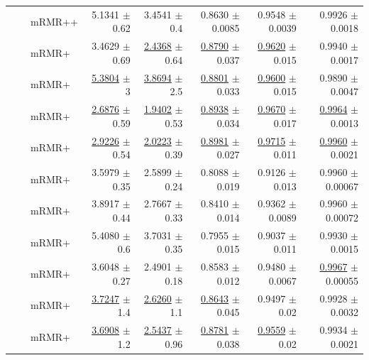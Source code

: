 \begin{longtable}{llp{}rrrrr}
 &  & mRMR++ & 5.1341 {\scriptsize $\pm$ 0.62} & 3.4541 {\scriptsize $\pm$ 0.4} & 0.8630 {\scriptsize $\pm$ 0.0085} & 0.9548 {\scriptsize $\pm$ 0.0039} & 0.9926 {\scriptsize $\pm$ 0.0018} \\
 &  & mRMR+ & 3.4629 {\scriptsize $\pm$ 0.69} & \underline{2.4368} {\scriptsize $\pm$ 0.64} & \underline{0.8790} {\scriptsize $\pm$ 0.037} & \underline{0.9620} {\scriptsize $\pm$ 0.015} & 0.9940 {\scriptsize $\pm$ 0.0017} \\
 &  & mRMR+ & \underline{5.3804} {\scriptsize $\pm$ 3} & \underline{3.8694} {\scriptsize $\pm$ 2.5} & \underline{0.8801} {\scriptsize $\pm$ 0.033} & \underline{0.9600} {\scriptsize $\pm$ 0.015} & 0.9890 {\scriptsize $\pm$ 0.0047} \\
 &  & mRMR+ & \underline{2.6876} {\scriptsize $\pm$ 0.59} & \underline{1.9402} {\scriptsize $\pm$ 0.53} & \underline{0.8938} {\scriptsize $\pm$ 0.034} & \underline{0.9670} {\scriptsize $\pm$ 0.017} & \underline{0.9964} {\scriptsize $\pm$ 0.0013} \\
 &  & mRMR+ & \underline{2.9226} {\scriptsize $\pm$ 0.54} & \underline{2.0223} {\scriptsize $\pm$ 0.39} & \underline{0.8981} {\scriptsize $\pm$ 0.027} & \underline{0.9715} {\scriptsize $\pm$ 0.011} & \underline{0.9960} {\scriptsize $\pm$ 0.0021} \\
 &  & mRMR+ & 3.5979 {\scriptsize $\pm$ 0.35} & 2.5899 {\scriptsize $\pm$ 0.24} & 0.8088 {\scriptsize $\pm$ 0.019} & 0.9126 {\scriptsize $\pm$ 0.013} & 0.9960 {\scriptsize $\pm$ 0.00067} \\
 &  & mRMR+ & 3.8917 {\scriptsize $\pm$ 0.44} & 2.7667 {\scriptsize $\pm$ 0.33} & 0.8410 {\scriptsize $\pm$ 0.014} & 0.9362 {\scriptsize $\pm$ 0.0089} & 0.9960 {\scriptsize $\pm$ 0.00072} \\
 &  & mRMR+ & 5.4080 {\scriptsize $\pm$ 0.6} & 3.7031 {\scriptsize $\pm$ 0.35} & 0.7955 {\scriptsize $\pm$ 0.015} & 0.9037 {\scriptsize $\pm$ 0.011} & 0.9930 {\scriptsize $\pm$ 0.0015} \\
 &  & mRMR+ & 3.6048 {\scriptsize $\pm$ 0.27} & 2.4901 {\scriptsize $\pm$ 0.18} & 0.8583 {\scriptsize $\pm$ 0.012} & 0.9480 {\scriptsize $\pm$ 0.0067} & \underline{0.9967} {\scriptsize $\pm$ 0.00055} \\
 &  & mRMR+ & \underline{3.7247} {\scriptsize $\pm$ 1.4} & \underline{2.6260} {\scriptsize $\pm$ 1.1} & \underline{0.8643} {\scriptsize $\pm$ 0.045} & 0.9497 {\scriptsize $\pm$ 0.02} & 0.9928 {\scriptsize $\pm$ 0.0032} \\
 &  & mRMR+ & \underline{3.6908} {\scriptsize $\pm$ 1.2} & \underline{2.5437} {\scriptsize $\pm$ 0.96} & \underline{0.8781} {\scriptsize $\pm$ 0.038} & \underline{0.9559} {\scriptsize $\pm$ 0.02} & 0.9934 {\scriptsize $\pm$ 0.0021} \\

\end{longtable}
